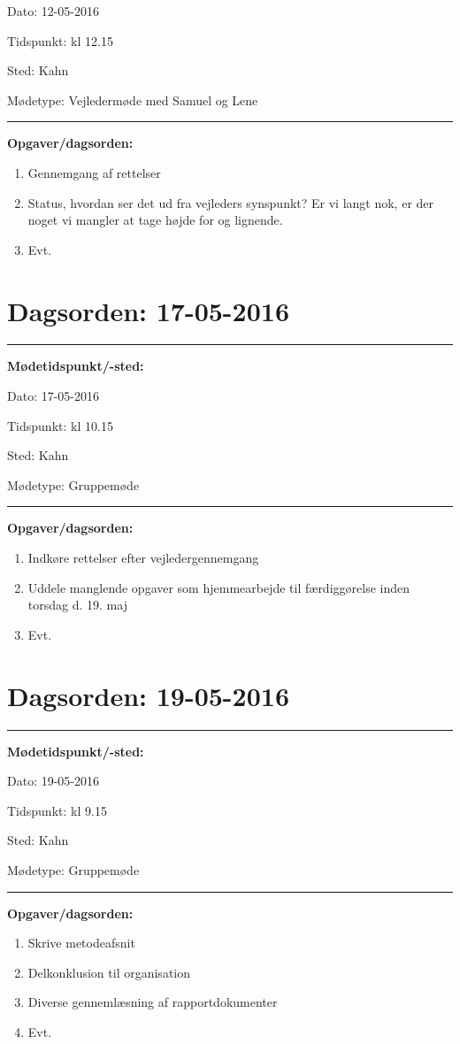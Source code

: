 Dato: \tabto{7em} 12-05-2016

Tidspunkt: \tabto{7em} kl 12.15

Sted: \tabto{7em} Kahn 

Mødetype: \tabto{7em} Vejledermøde med Samuel og Lene \newline


\hrule
\textbf{Opgaver/dagsorden:} \newline
\begin{enumerate}
	\item Gennemgang af rettelser
	\item Status, hvordan ser det ud fra vejleders synspunkt? Er vi langt nok, er der noget vi mangler at tage højde for og lignende. 
	\item Evt. 
\end{enumerate}

\section{Dagsorden: 17-05-2016 }
\hrule
\textbf{Mødetidspunkt/-sted:} 

Dato: \tabto{7em} 17-05-2016

Tidspunkt: \tabto{7em} kl 10.15

Sted: \tabto{7em} Kahn 

Mødetype: \tabto{7em} Gruppemøde \newline


\hrule
\textbf{Opgaver/dagsorden:} \newline
\begin{enumerate}
	\item Indkøre rettelser efter vejledergennemgang
	\item Uddele manglende opgaver som hjemmearbejde til færdiggørelse inden torsdag d. 19. maj
	\item Evt. 
\end{enumerate}

\newpage
\section{Dagsorden: 19-05-2016 }
\hrule
\textbf{Mødetidspunkt/-sted:} 

Dato: \tabto{7em} 19-05-2016

Tidspunkt: \tabto{7em} kl 9.15

Sted: \tabto{7em} Kahn 

Mødetype: \tabto{7em} Gruppemøde \newline


\hrule
\textbf{Opgaver/dagsorden:} \newline
\begin{enumerate}
	\item Skrive metodeafsnit
	\item Delkonklusion til organisation
	\item Diverse gennemlæsning af rapportdokumenter
	\item Evt. 
\end{enumerate}